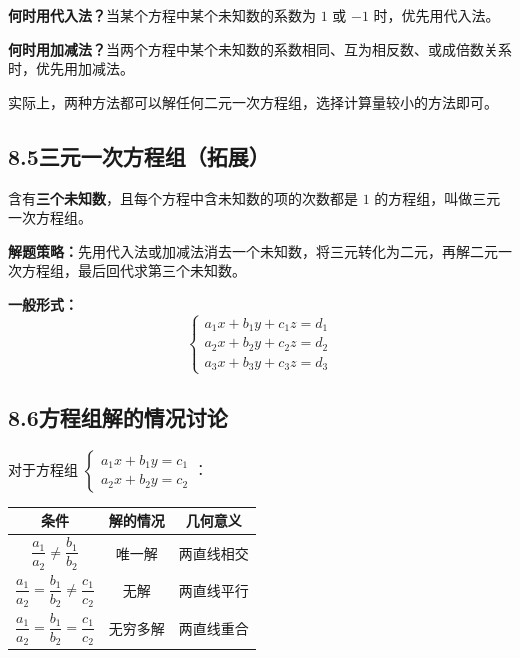 \documentclass[12pt, a4paper]{ctexart}
\begin{document}
\begin{tipbox}[方法选择指南]
\textbf{何时用代入法？}当某个方程中某个未知数的系数为 $1$ 或 $-1$ 时，优先用代入法。

\medskip
\textbf{何时用加减法？}当两个方程中某个未知数的系数相同、互为相反数、或成倍数关系时，优先用加减法。

\medskip
实际上，两种方法都可以解任何二元一次方程组，选择计算量较小的方法即可。
\end{tipbox}

\subsection*{8.5\quad 三元一次方程组（拓展）}

\begin{knowledgebox}[三元一次方程组]
含有\textbf{三个未知数}，且每个方程中含未知数的项的次数都是 $1$ 的方程组，叫做三元一次方程组。

\medskip
\textbf{解题策略：}先用代入法或加减法消去一个未知数，将三元转化为二元，再解二元一次方程组，最后回代求第三个未知数。

\medskip
\textbf{一般形式：}
$$\begin{cases} a_1 x + b_1 y + c_1 z = d_1 \\ a_2 x + b_2 y + c_2 z = d_2 \\ a_3 x + b_3 y + c_3 z = d_3 \end{cases}$$
\end{knowledgebox}

\subsection*{8.6\quad 方程组解的情况讨论}

\begin{knowledgebox}[二元一次方程组解的情况]
对于方程组 $\begin{cases} a_1 x + b_1 y = c_1 \\ a_2 x + b_2 y = c_2 \end{cases}$：

\begin{center}
\renewcommand{\arraystretch}{1.5}
\begin{tabular}{|c|c|c|}
\hline
\textbf{条件} & \textbf{解的情况} & \textbf{几何意义} \\
\hline
$\dfrac{a_1}{a_2} \neq \dfrac{b_1}{b_2}$ & 唯一解 & 两直线相交 \\
\hline
$\dfrac{a_1}{a_2} = \dfrac{b_1}{b_2} \neq \dfrac{c_1}{c_2}$ & 无解 & 两直线平行 \\
\hline
$\dfrac{a_1}{a_2} = \dfrac{b_1}{b_2} = \dfrac{c_1}{c_2}$ & 无穷多解 & 两直线重合 \\
\hline
\end{tabular}
\end{center}
\end{knowledgebox}
\end{document}
